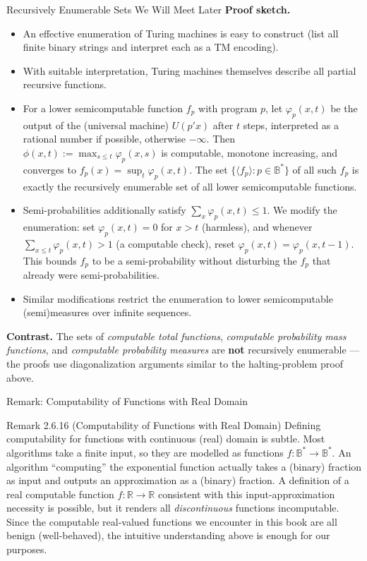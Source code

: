 \documentclass[aspectratio=169,10pt]{beamer}
\newcommand{\B}{\mathbb{B}}
\newcommand{\R}{\mathbb{R}}
\begin{document}
\begin{frame}[allowframebreaks]{Recursively Enumerable Sets We Will Meet Later}
  \framebreak
  \textbf{Proof sketch.}
  \begin{itemize}
    \item[(i)] An effective enumeration of Turing machines is easy to
      construct (list all finite binary strings and interpret each as a TM
      encoding).
    \item[(ii)] With suitable interpretation, Turing machines themselves
      describe all partial recursive functions.
    \item[(iii)] For a lower semicomputable function $f_p$ with program $p$,
      let $\varphi_p(x,t)$ be the output of the (universal machine) $U(p'x)$
      after $t$ steps, interpreted as a rational number if possible,
      otherwise $-\infty$. Then
      $\phi(x,t) := \max_{s \leq t} \varphi_p(x,s)$ is computable, monotone
      increasing, and converges to $f_p(x) = \sup_t \varphi_p(x,t)$. The set
      $\{\langle f_p \rangle : p \in \B^{*}\}$ of all such $f_p$ is exactly the
      recursively enumerable set of all lower semicomputable functions.
    \item[(iv)] Semi-probabilities additionally satisfy
      $\sum_x \varphi_p(x,t) \leq 1$. We modify the enumeration: set
      $\varphi_p(x,t) = 0$ for $x > t$ (harmless), and whenever
      $\sum_{x \leq t} \varphi_p(x,t) > 1$ (a computable check), reset
      $\varphi_p(x,t) = \varphi_p(x,t-1)$. This bounds $f_p$ to be a
      semi-probability without disturbing the $f_p$ that already were
      semi-probabilities.
    \item[(v)] Similar modifications restrict the enumeration to lower
      semicomputable (semi)measures over infinite sequences.
  \end{itemize}
  \textbf{Contrast.} The sets of \emph{computable total functions},
  \emph{computable probability mass functions}, and \emph{computable
  probability measures} are \textbf{not} recursively enumerable --- the proofs
  use diagonalization arguments similar to the halting-problem proof above.
\end{frame}

\begin{frame}{Remark: Computability of Functions with Real Domain}
  \begin{block}{Remark 2.6.16 (Computability of Functions with Real Domain)}
    Defining computability for functions with continuous (real) domain is
    subtle. Most algorithms take a finite input, so they are modelled as
    functions $f : \B^{*} \to \B^{*}$. An algorithm ``computing'' the
    exponential function actually takes a (binary) fraction as input and
    outputs an approximation as a (binary) fraction. A definition of a real
    computable function $f : \R \to \R$ consistent with this
    input-approximation necessity is possible, but it renders all
    \emph{discontinuous} functions incomputable. Since the computable
    real-valued functions we encounter in this book are all benign
    (well-behaved), the intuitive understanding above is enough for our
    purposes.
  \end{block}
\end{frame}
\end{document}
